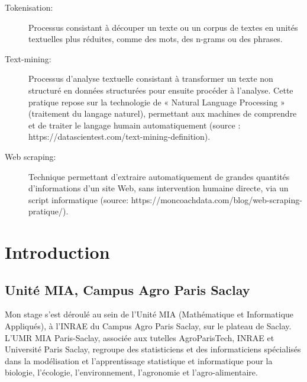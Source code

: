 \documentclass{book}
\begin{document}
\begin{description}
    \item[Tokenisation:] Processus consistant à découper un texte ou un corpus
        de textes en unités textuelles plus réduites, comme des mots, des n-grams ou
        des phrases.

    \item[Text-mining:] Processus d'analyse textuelle consistant à transformer
        un texte non structuré en données structurées pour ensuite procéder à
        l’analyse. Cette pratique repose sur la technologie de « Natural Language
        Processing » (traitement du langage naturel), permettant aux machines de
        comprendre et de traiter le langage humain automatiquement (source :
        https://datascientest.com/text-mining-definition).

    \item[Web scraping:] Technique permettant d’extraire automatiquement de
        grandes quantités d’informations d’un site Web, sans intervention humaine
        directe, via un script informatique (source:
        https://moncoachdata.com/blog/web-scraping-pratique/).
\end{description}

\thispagestyle{fancy}

\newpage
\mbox{} %
\thispagestyle{fancy}
\newpage


\newpage
\fancyhead[LE,RO]{\leftmark}
\chapter{\label{Premier Chapitre}Introduction}

\section{Unité MIA, Campus Agro Paris Saclay}
\noindent
Mon stage s'est déroulé au sein de l'Unité MIA (Mathématique et Informatique
Appliqués), à l'INRAE du Campus Agro Paris Saclay, sur le plateau de Saclay. L’UMR MIA Paris-Saclay, associée aux tutelles AgroParisTech, INRAE et Université Paris Saclay, regroupe des statisticiens et des informaticiens spécialisés dans la modélisation et l’apprentissage statistique et informatique pour la biologie, l’écologie, l’environnement, l’agronomie et l’agro-alimentaire. 
\end{document}
